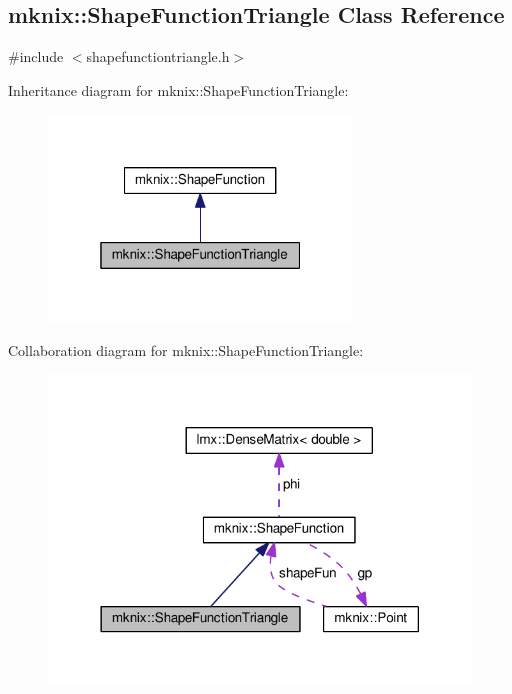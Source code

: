 \hypertarget{classmknix_1_1_shape_function_triangle}{}\subsection{mknix\+:\+:Shape\+Function\+Triangle Class Reference}
\label{classmknix_1_1_shape_function_triangle}


{\ttfamily \#include $<$shapefunctiontriangle.\+h$>$}



Inheritance diagram for mknix\+:\+:Shape\+Function\+Triangle\+:\nopagebreak
\begin{figure}[H]
\begin{center}
\leavevmode
\includegraphics[width=229pt]{d9/da8/classmknix_1_1_shape_function_triangle__inherit__graph}
\end{center}
\end{figure}


Collaboration diagram for mknix\+:\+:Shape\+Function\+Triangle\+:\nopagebreak
\begin{figure}[H]
\begin{center}
\leavevmode
\includegraphics[width=318pt]{de/dcb/classmknix_1_1_shape_function_triangle__coll__graph}
\end{center}
\end{figure}

